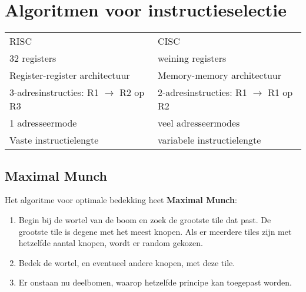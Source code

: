 \section{Algoritmen voor instructieselectie}
\begin{table}[ht]
	\centering
	\begin{tabular}{l | l}
		RISC & CISC \\
		32 registers & weining registers \\
		Register-register architectuur & Memory-memory architectuur \\
		3-adresinstructies: R1 $\rightarrow$ R2 op R3 & 2-adresinstructies: R1 $\rightarrow$ R1 op R2 \\
		1 adresseermode & veel adresseermodes \\
		Vaste instructielengte & variabele instructielengte \\
	\end{tabular}
\end{table}

\subsection{Maximal Munch}
Het algoritme voor optimale bedekking heet \textbf{Maximal Munch}:
\begin{enumerate}
	\item Begin bij de wortel van de boom en zoek de grootste tile dat past. De grootste tile is degene met het meest knopen. Als er meerdere tiles zijn met hetzelfde aantal knopen, wordt er random gekozen.
	\item Bedek de wortel, en eventueel andere knopen, met deze tile.
	\item Er onstaan nu deelbomen, waarop hetzelfde principe kan toegepast worden.
\end{enumerate}


